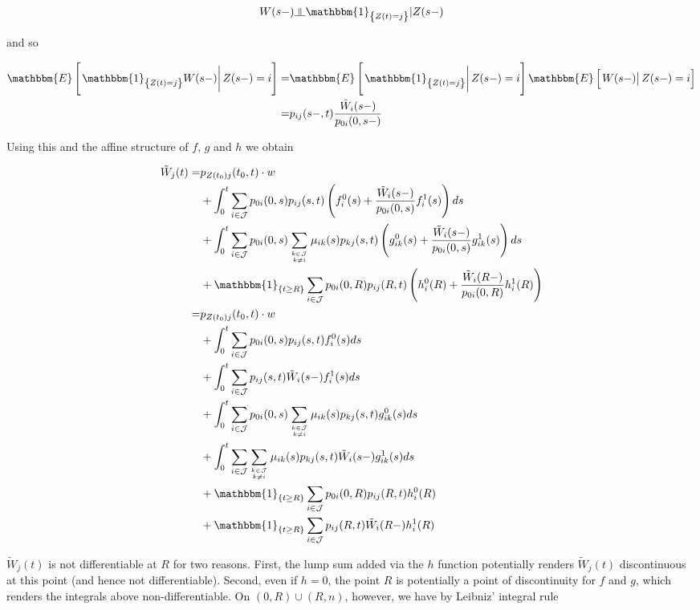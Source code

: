 \documentclass{article}
\newcommand{\indep}{\rotatebox[origin=c]{90}{$\models$}}
\newcommand{\1}[1]{\mathbbm{1}_{\left\lbrace #1 \right\rbrace}}
\newcommand{\econd}[2][def]{\mathbbm{E} \left[ \left. #1 \right| #2 \right]}
\theoremstyle{break}
\theoremstyle{remark}
\numberwithin{equation}{section}
\begin{document}
\begin{appendices}
\begin{align*}
	W(s-) \indep \1{Z(t)=j} | Z(s-)
\end{align*}

and so

\begin{align*}
	\econd[\1{Z(t)=j}W(s-)]{Z(s-)=i} =& \econd[\1{Z(t)=j}]{Z(s-)=i} \econd[W(s-)]{Z(s-)=i} \\
	=& p_{ij}(s-,t) \frac{\tilde{W}_i(s-)}{p_{0i}(0,s-)}
\end{align*}


Using this and the affine structure of $f$, $g$ and $h$ we obtain

\begin{align}
\tilde{W}_j(t) =& p_{Z(t_0)j}(t_0,t) \cdot w \\
&+ \int_0^t \sum_{i \in \mathcal{J}} p_{0i}(0,s) p_{ij}(s,t) \left( f_i^0(s) + \frac{\tilde{W}_i(s-)}{p_{0i}(0,s)} f_i^1(s) \right) ds \\
&+ \int_0^t \sum_{i \in \mathcal{J}} p_{0i}(0,s) \sum_{k \in \mathcal{J} \atop k \neq i} \mu_{ik}(s) p_{kj}(s,t) \left( g_{ik}^0(s) + \frac{\tilde{W}_i(s-)}{p_{0i}(0,s)} g_{ik}^1(s) \right) ds \\
&+ \1{t \geq R}\sum_{i \in \mathcal{J}} p_{0i}(0,R) p_{ij}(R,t) \left( h_i^0(R) + \frac{\tilde{W}_i(R-)}{p_{0i}(0,R)} h_i^1(R) \right) \\
=& p_{Z(t_0)j}(t_0,t) \cdot w \label{FirstLineA} \\
&+ \int_0^t \sum_{i \in \mathcal{J}} p_{0i}(0,s) p_{ij}(s,t) f_i^0(s) ds \\
&+ \int_0^t \sum_{i \in \mathcal{J}} p_{ij}(s,t) \tilde{W}_i(s-) f_i^1(s) ds \\
&+ \int_0^t \sum_{i \in \mathcal{J}} p_{0i}(0,s) \sum_{k \in \mathcal{J} \atop k \neq i} \mu_{ik}(s) p_{kj}(s,t) g_{ik}^0(s) ds \\
&+ \int_0^t \sum_{i \in \mathcal{J}} \sum_{k \in \mathcal{J} \atop k \neq i} \mu_{ik}(s) p_{kj}(s,t) \tilde{W}_i(s-) g_{ik}^1(s) ds \\
&+ \1{t \geq R}\sum_{i \in \mathcal{J}} p_{0i}(0,R) p_{ij}(R,t) h_i^0(R) \label{FirstGlue} \\
&+ \1{t \geq R}\sum_{i \in \mathcal{J}} p_{ij}(R,t) \tilde{W}_i(R-) h_i^1(R) \label{SecondGlue}
\end{align}

$\tilde{W}_j(t)$ is not differentiable at $R$ for two reasons. First, the lump sum added via the $h$ function potentially renders $\tilde{W}_j(t)$ discontinuous at this point (and hence not differentiable). Second, even if $h=0$, the point $R$ is potentially a point of discontinuity for $f$ and $g$, which renders the integrals above non-differentiable. On $(0,R)\cup(R,n)$, however, we have by Leibniz' integral rule


\end{appendices}
\end{document}
